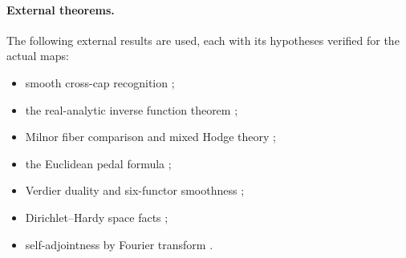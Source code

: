 \documentclass[11pt]{article}
\theoremstyle{definition}\newtheorem{definition}[theorem]{Definition}
\theoremstyle{remark}\newtheorem{remark}[theorem]{Remark}
\begin{document}
\paragraph{External theorems.} The following external results are used, each
with its hypotheses verified for the actual maps:
\begin{itemize}
\item smooth cross-cap recognition \cite{hasegawa};
\item the real-analytic inverse function theorem \cite{krantzparks};
\item Milnor fiber comparison and mixed Hodge theory \cite{milnor,dimca,deligne,peters};
\item the Euclidean pedal formula \cite{principal};
\item Verdier duality and six-functor smoothness \cite{knp,scholze,ks};
\item Dirichlet--Hardy space facts \cite{hardy};
\item self-adjointness by Fourier transform \cite{reed}.
\end{itemize}
\end{document}
